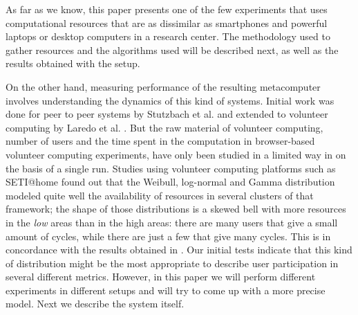 \documentclass[journal,onecolumn]{IEEEtran}
\begin{document}
As far as we know, this paper presents one of the few experiments that
uses computational
resources that are as dissimilar as smartphones and powerful laptops
or desktop computers in a research center. The methodology used to
gather resources and the algorithms used will be described next, as
well as the results obtained with the setup.




On the other hand, measuring performance of the resulting metacomputer
involves understanding the dynamics of this kind of systems. Initial
work was done for peer to peer systems by Stutzbach et
al. \cite{stutzbach2006understanding} and extended to volunteer
computing by Laredo et al. \cite{churn08,laredo2008rcp}. But the raw material of
volunteer computing, number of users and the time spent in the
computation in browser-based volunteer computing experiments, have only been studied in a limited way in
\cite{DBLP:journals/gpem/LaredoBGVAGF14} on the basis of a single
run. Studies using volunteer computing platforms such as SETI@home
\cite{javadi2009mining} found out that the Weibull, log-normal and Gamma distribution
modeled quite well the availability of resources in several clusters
of that framework; the shape of those distributions is a skewed bell
with more resources in the {\em low} areas than in the high areas:
there are many users that give a small amount of cycles, while there
are just a few that give many cycles. This is in concordance with the
results obtained in \cite{agajaj}. Our initial tests indicate that
this kind of distribution might be the most appropriate to describe
user participation in several different metrics. However, in this
paper we will perform different experiments in different setups and
will try to come up with a more precise model. Next we describe the
system itself.
\end{document}
